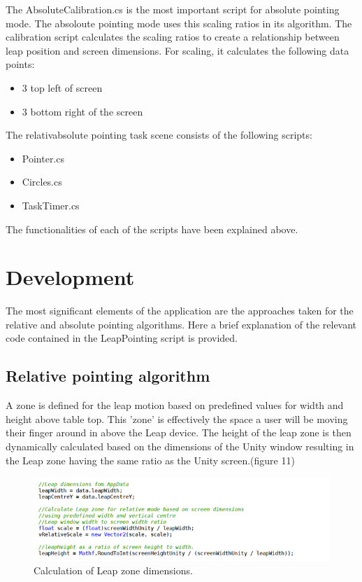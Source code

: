 \documentclass[titlepage]{article}
\begin{document}
The AbsoluteCalibration.cs is the most important script for absolute pointing mode. The absoloute pointing mode uses this scaling ratios in its algorithm. The calibration script calculates the scaling ratios to create a relationship between leap position and screen dimensions. For scaling, it calculates the following data points:

\begin{itemize}
    \item 3 top left of screen
    \item 3 bottom right of the screen

\end{itemize}


The relativabsolute pointing task scene consists of the following scripts:

\begin{itemize}
    \item Pointer.cs
    \item Circles.cs
    \item TaskTimer.cs
    
\end{itemize}

The functionalities of each of the scripts have been explained above.

\section{Development}

The most significant elements of the application are the approaches taken for the relative and absolute pointing algorithms. Here a brief explanation of the relevant code contained in the LeapPointing script is provided.

\subsection{Relative pointing algorithm}
A zone is defined for the leap motion based on predefined values for width and height above table top. This 'zone' is effectively the space a user will be moving their finger around in above the Leap device. The height of the leap zone is then dynamically calculated based on the dimensions of the Unity window resulting in the Leap zone having the same ratio as the Unity screen.(figure 11)

\begin{figure}[!h]
    \centering
    \includegraphics[width=7.0in]{Figure_10}
    \caption{Calculation of Leap zone dimensions.}
\end{figure}
\end{document}
